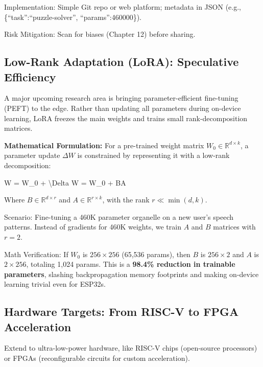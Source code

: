 \documentclass[
]{article}
\newenvironment{Shaded}{}{}
\newcommand{\NormalTok}[1]{#1}
\begin{document}
Implementation: Simple Git repo or web platform; metadata in JSON (e.g.,
\{``task'':``puzzle-solver'', ``params'':460000\}).

Risk Mitigation: Scan for biases (Chapter 12) before sharing.

\subsection{Low-Rank Adaptation (LoRA): Speculative
Efficiency}\label{low-rank-adaptation-lora-speculative-efficiency}

A major upcoming research area is bringing parameter-efficient
fine-tuning (PEFT) to the edge. Rather than updating all parameters
during on-device learning, LoRA freezes the main weights and trains
small rank-decomposition matrices.

\textbf{Mathematical Formulation:} For a pre-trained weight matrix
\(W_0 \in \mathbb{R}^{d \times k}\), a parameter update \(\Delta W\) is
constrained by representing it with a low-rank decomposition:

\begin{Shaded}
\begin{Highlighting}[]
\NormalTok{W = W\_0 + \textbackslash{}Delta W = W\_0 + BA}
\end{Highlighting}
\end{Shaded}

Where \(B \in \mathbb{R}^{d \times r}\) and
\(A \in \mathbb{R}^{r \times k}\), with the rank \(r \ll \min(d, k)\).

Scenario: Fine-tuning a 460K parameter organelle on a new user's speech
patterns. Instead of gradients for 460K weights, we train \(A\) and
\(B\) matrices with \(r=2\).

Math Verification: If \(W_0\) is \(256 \times 256\) (65,536 params),
then \(B\) is \(256 \times 2\) and \(A\) is \(2 \times 256\), totaling
1,024 params. This is a \textbf{98.4\% reduction in trainable
parameters}, slashing backpropagation memory footprints and making
on-device learning trivial even for ESP32s.

\subsection{Hardware Targets: From RISC-V to FPGA
Acceleration}\label{hardware-targets-from-risc-v-to-fpga-acceleration}

Extend to ultra-low-power hardware, like RISC-V chips (open-source
processors) or FPGAs (reconfigurable circuits for custom acceleration).
\end{document}
